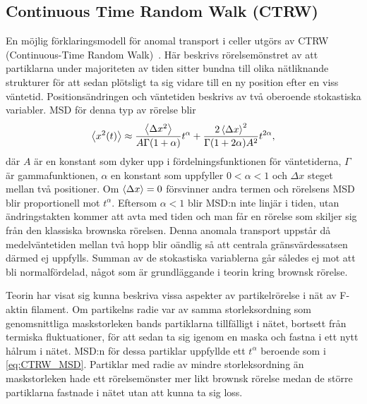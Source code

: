 \subsection{Continuous Time Random Walk (CTRW)}
En möjlig förklaringsmodell för anomal transport i celler utgörs av CTRW (Continuous-Time Random Walk)~\cite{Hofling&Franosch2013}. Här beskrivs rörelsemönstret av att partiklarna under majoriteten av tiden sitter bundna till olika nätliknande strukturer för att sedan plötsligt ta sig vidare till en ny position efter en viss väntetid. Positionsändringen och väntetiden beskrivs av två oberoende stokastiska variabler. 
MSD för denna typ av rörelse blir\cite{Barkai_CTRW}
\begin{equation}\label{eq:CTRW_MSD}
    \ev{x^2(t)} \approx \frac{\ev{\Delta x^2}}{A \Gamma(1+\alpha)}t^{\alpha} + \frac{2\ev{\Delta x}^2}{\Gamma(1+2\alpha)A^2} t^{2\alpha}, 
\end{equation}
där $A$ är en konstant som dyker upp i fördelningsfunktionen för väntetiderna, $\Gamma$ är gammafunktionen, $\alpha$ en konstant som uppfyller $0<\alpha<1$ och $\Delta x$ steget mellan två positioner. Om $\ev{\Delta x}=0 $ försvinner andra termen och rörelsens MSD blir proportionell mot $t^\alpha$. Eftersom $\alpha < 1$ blir MSD:n inte linjär i tiden, utan ändringstakten kommer att avta med tiden och man får en rörelse som skiljer sig från den klassiska brownska rörelsen.
Denna anomala transport uppstår då medelväntetiden mellan två hopp blir oändlig så att centrala gränsvärdessatsen därmed ej uppfylls. Summan av de stokastiska variablerna går således ej mot att bli normalfördelad, något som är grundläggande i teorin kring brownsk rörelse. 

Teorin har visat sig kunna beskriva vissa aspekter av partikelrörelse i nät av F-aktin filament\cite{Barkai_CTRW}. Om partikelns radie var av samma storleksordning som genomsnittliga maskstorleken bands partiklarna tillfälligt i nätet, bortsett från termiska fluktuationer, för att sedan ta sig igenom en maska och fastna i ett nytt hålrum i nätet. MSD:n för dessa partiklar uppfyllde ett $t^{\alpha}$ beroende som i \eqref{eq:CTRW_MSD}. Partiklar med radie av mindre storleksordning än maskstorleken hade ett rörelsemönster mer likt brownsk rörelse medan de större partiklarna fastnade i nätet utan att kunna ta sig loss.



